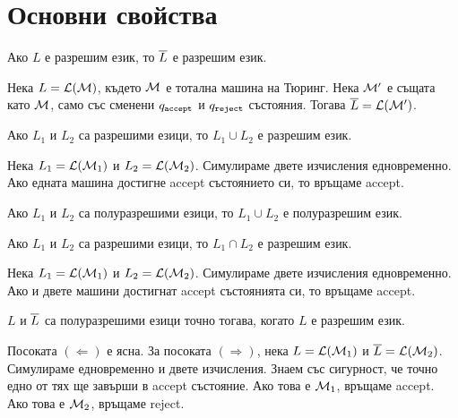 \section{Основни свойства}

\begin{prop}
  Ако $L$ е разрешим език, то $\overline{L}$ е разрешим език.
\end{prop}
\begin{hint}
  Нека $L = \mathcal{L}(\mathcal{M})$, където $\mathcal{M}$ е тотална машина на Тюринг.
  Нека $\mathcal{M}'$ е същата като $\mathcal{M}$, само със сменени $q_{\texttt{accept}}$ и $q_{\texttt{reject}}$ състояния.
  Тогава $\overline{L} = \mathcal{L}(\mathcal{M}')$.
\end{hint}

\begin{prop}
  Ако $L_1$ и $L_2$ са разрешими езици, то $L_1 \cup L_2$ е разрешим език.
\end{prop}
\begin{hint}
  Нека $L_1 = \mathcal{L}(\mathcal{M}_1)$ и $L_2 = \mathcal{L}(\mathcal{M}_2)$.
  Симулираме двете изчисления едновременно.
  Ако едната машина достигне accept състоянието си, то връщаме accept.
\end{hint}

\begin{prop}
  Ако $L_1$ и $L_2$ са полуразрешими езици, то $L_1 \cup L_2$ е полуразрешим език.
\end{prop}

\begin{prop}
  Ако $L_1$ и $L_2$ са разрешими езици, то $L_1 \cap L_2$ е разрешим език.
\end{prop}
\begin{hint}
  Нека $L_1 = \mathcal{L}(\mathcal{M}_1)$ и $L_2 = \mathcal{L}(\mathcal{M}_2)$.
  Симулираме двете изчисления едновременно.
  Ако и двете машини достигнат accept състоянията си, то връщаме accept.
\end{hint}

\begin{framed}
  \begin{thm}
    $L$ и $\overline{L}$ са полуразрешими езици точно тогава, когато $L$ е разрешим език.
  \end{thm}
\end{framed}
\begin{hint}
  Посоката $(\Leftarrow)$ е ясна.
  За посоката $(\Rightarrow)$, нека $L = \mathcal{L}(\mathcal{M}_1)$ и $\overline{L} = \mathcal{L}(\mathcal{M}_2)$.
  Симулираме едновременно и двете изчисления.
  Знаем със сигурност, че точно едно от тях ще завърши в accept състояние.
  Ако това е $\mathcal{M}_1$, връщаме accept.
  Ако това е $\mathcal{M}_2$, връщаме reject.
\end{hint}

